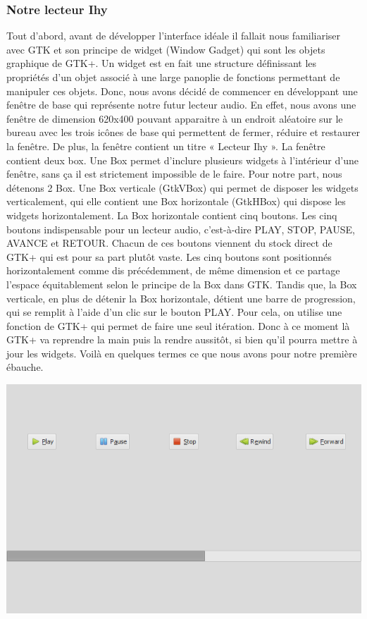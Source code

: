 \documentclass[a4paper,12pt]{article}
\begin{document}
		\subsubsection{Notre lecteur Ihy}
Tout d'abord, avant de développer l'interface idéale il fallait nous
familiariser avec GTK et son principe de widget (Window Gadget) qui sont les
objets graphique de GTK+. Un widget est en fait une structure définissant les
propriétés d'un objet associé à une large panoplie de fonctions permettant de
manipuler ces objets. Donc, nous avons décidé de commencer en développant une
fenêtre de base qui représente notre futur lecteur audio. En effet, nous avons
une fenêtre de dimension 620x400 pouvant apparaitre à un endroit aléatoire sur
le bureau avec les trois icônes de base qui permettent de fermer, réduire et
restaurer la fenêtre. De plus, la fenêtre contient un titre « Lecteur Ihy ».  La
fenêtre contient deux box. Une Box permet d'inclure plusieurs widgets à
l'intérieur d'une fenêtre, sans ça il est strictement impossible de le faire.
Pour notre part, nous détenons 2 Box. Une Box verticale (GtkVBox) qui permet de
disposer les widgets verticalement, qui elle contient une Box horizontale
(GtkHBox) qui dispose les widgets horizontalement. La Box horizontale contient
cinq boutons. Les cinq boutons indispensable pour un lecteur audio, c'est-à-dire
PLAY, STOP, PAUSE, AVANCE et RETOUR. Chacun de ces boutons viennent du stock
direct de GTK+ qui est pour sa part plutôt vaste. Les cinq boutons sont
positionnés horizontalement comme dis précédemment, de même dimension et ce
partage l'espace équitablement selon le principe de la Box dans GTK.  Tandis
que, la Box verticale, en plus de détenir la Box horizontale, détient une barre
de progression, qui se remplit à l'aide d'un clic sur le bouton PLAY. Pour
cela, on utilise une fonction de GTK+ qui permet de faire une seul itération.
Donc à ce moment là GTK+ va reprendre la main puis la rendre aussitôt, si bien
qu’il pourra mettre à jour les widgets.  Voilà en quelques termes ce que
nous avons pour notre première ébauche.
\begin{center}
\includegraphics[scale=0.50]{img/gtk.png}
\end{center}
\end{document}
